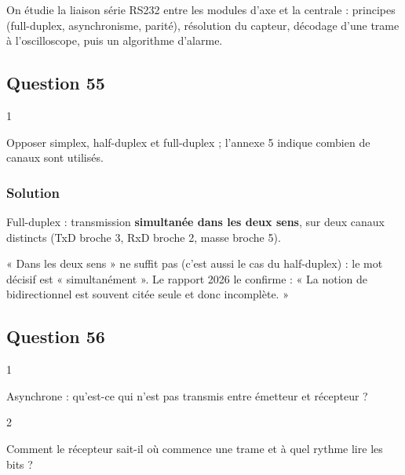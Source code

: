 \documentclass[11pt,a4paper]{article}
\begin{document}
On étudie la liaison série RS232 entre les modules d'axe et la centrale : principes (full-duplex, asynchronisme, parité), résolution du capteur, décodage d'une trame à l'oscilloscope, puis un algorithme d'alarme.

\hypertarget{question-55}{%
\subsection{Question 55}\label{question-55}}

\begin{indication}{1}

Opposer simplex, half-duplex et full-duplex ; l'annexe 5 indique combien de canaux sont utilisés.

\end{indication}

\hypertarget{solution-54}{%
\subsubsection{Solution}\label{solution-54}}

Full-duplex : transmission \textbf{simultanée dans les deux sens}, sur deux canaux distincts (TxD broche 3, RxD broche 2, masse broche 5).

\begin{piege}

« Dans les deux sens » ne suffit pas (c'est aussi le cas du half-duplex) : le mot décisif est « simultanément ». Le rapport 2026 le confirme : « La notion de bidirectionnel est souvent citée seule et donc incomplète. »

\end{piege}

\hypertarget{question-56}{%
\subsection{Question 56}\label{question-56}}

\begin{indication}{1}

Asynchrone : qu'est-ce qui n'est pas transmis entre émetteur et récepteur ?

\end{indication}

\begin{indication}{2}

Comment le récepteur sait-il où commence une trame et à quel rythme lire les bits ?

\end{indication}
\end{document}
